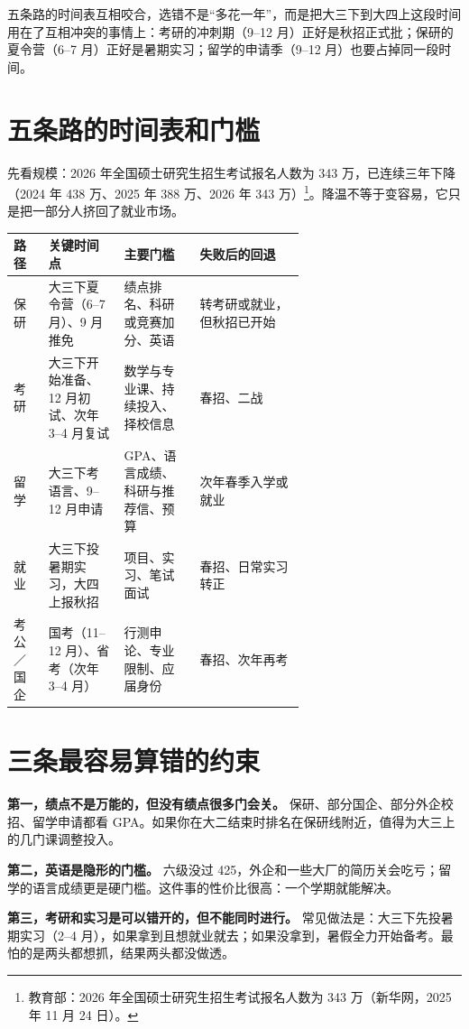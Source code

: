 \documentclass[UTF8,zihao=5,openany]{ctexbook}
\begin{document}
五条路的时间表互相咬合，选错不是“多花一年”，而是把大三下到大四上这段时间用在了互相冲突的事情上：考研的冲刺期（9--12 月）正好是秋招正式批；保研的夏令营（6--7 月）正好是暑期实习；留学的申请季（9--12 月）也要占掉同一段时间。

\section{五条路的时间表和门槛}
先看规模：2026 年全国硕士研究生招生考试报名人数为 343 万，已连续三年下降（2024 年 438 万、2025 年 388 万、2026 年 343 万）\footnote{教育部：2026 年全国硕士研究生招生考试报名人数为 343 万（新华网，2025 年 11 月 24 日）。}。降温不等于变容易，它只是把一部分人挤回了就业市场。

\begin{center}\small
\begin{tabularx}{\linewidth}{p{0.12\linewidth}p{0.26\linewidth}p{0.26\linewidth}Y}
\toprule
路径 & 关键时间点 & 主要门槛 & 失败后的回退 \\
\midrule
保研 & 大三下夏令营（6--7 月）、9 月推免 & 绩点排名、科研或竞赛加分、英语 & 转考研或就业，但秋招已开始 \\
考研 & 大三下开始准备、12 月初试、次年 3--4 月复试 & 数学与专业课、持续投入、择校信息 & 春招、二战 \\
留学 & 大三下考语言、9--12 月申请 & GPA、语言成绩、科研与推荐信、预算 & 次年春季入学或就业 \\
就业 & 大三下投暑期实习，大四上报秋招 & 项目、实习、笔试面试 & 春招、日常实习转正 \\
考公／国企 & 国考（11--12 月）、省考（次年 3--4 月） & 行测申论、专业限制、应届身份 & 春招、次年再考 \\
\bottomrule
\end{tabularx}
\end{center}

\section{三条最容易算错的约束}
\textbf{第一，绩点不是万能的，但没有绩点很多门会关。} 保研、部分国企、部分外企校招、留学申请都看 GPA。如果你在大二结束时排名在保研线附近，值得为大三上的几门课调整投入。

\textbf{第二，英语是隐形的门槛。} 六级没过 425，外企和一些大厂的简历关会吃亏；留学的语言成绩更是硬门槛。这件事的性价比很高：一个学期就能解决。

\textbf{第三，考研和实习是可以错开的，但不能同时进行。} 常见做法是：大三下先投暑期实习（2--4 月），如果拿到且想就业就去；如果没拿到，暑假全力开始备考。最怕的是两头都想抓，结果两头都没做透。
\end{document}
